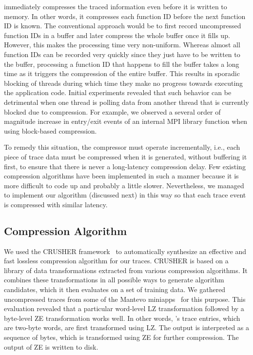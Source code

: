 \parlot immediately compresses the traced information even before it is written to memory. In other words, it compresses each function ID before the next function ID is known. The conventional approach would be to first record uncompressed function IDs in a buffer and later compress the whole buffer once it fills up. However, this makes the processing time very non-uniform. Whereas almost all function IDs can be recorded very quickly since they just have to be written to the buffer, processing a function ID that happens to fill the buffer takes a long time as it triggers the compression of the entire buffer. This results in sporadic blocking of threads during which time they make no progress towards executing the application code. Initial experiments revealed that such behavior can be detrimental when one thread is polling data from another thread that is currently blocked due to compression. For example, we observed a several order of magnitude increase in entry/exit events of an internal MPI library function when using block-based compression.

To remedy this situation, the compressor must operate incrementally, i.e., each piece of trace data must be compressed when it is generated, without buffering it first, to ensure that there is never a long-latency compression delay. Few existing compression algorithms have been implemented in such a manner because it is more difficult to code up and probably a little slower. Nevertheless, we managed to implement our algorithm (discussed next) in this way so that each trace event is compressed with similar latency.


\subsection{Compression Algorithm}

We used the CRUSHER framework~\cite{mb-cluster15, mb-space16, mb-sc16, mb-dcc18} to automatically synthesize an effective and fast lossless compression algorithm for our traces. CRUSHER is based on a library of data transformations extracted from various compression algorithms. It combines these transformations in all possible ways to generate algorithm candidates, which it then evaluates on a set of training data. We gathered uncompressed traces from some of the Mantevo miniapps~\cite{mantevo} for this purpose. This evaluation revealed that a particular word-level LZ transformation followed by a byte-level ZE transformation works well. In other words, \parlot 's trace entries, which are two-byte words, are first transformed using LZ. The output is interpreted as a sequence of bytes, which is transformed using ZE for further compression. The output of ZE is written to disk.

